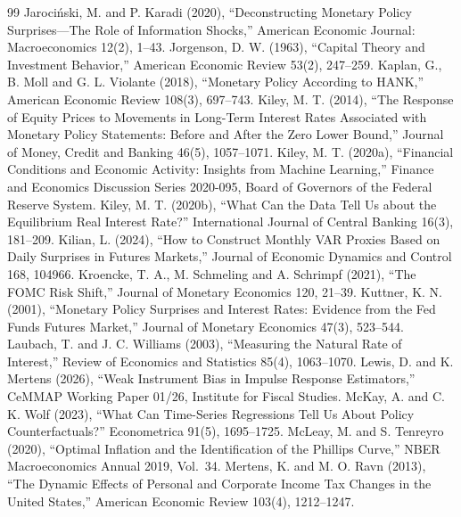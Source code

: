 \documentclass[11pt]{article}
\begin{document}
\begin{thebibliography}{99}
 Jaroci\'nski, M. and P. Karadi (2020), ``Deconstructing Monetary Policy Surprises---The Role of Information Shocks,'' American Economic Journal: Macroeconomics 12(2), 1--43.
 Jorgenson, D. W. (1963), ``Capital Theory and Investment Behavior,'' American Economic Review 53(2), 247--259.
 Kaplan, G., B. Moll and G. L. Violante (2018), ``Monetary Policy According to HANK,'' American Economic Review 108(3), 697--743.
 Kiley, M. T. (2014), ``The Response of Equity Prices to Movements in Long-Term Interest Rates Associated with Monetary Policy Statements: Before and After the Zero Lower Bound,'' Journal of Money, Credit and Banking 46(5), 1057--1071.
 Kiley, M. T. (2020a), ``Financial Conditions and Economic Activity: Insights from Machine Learning,'' Finance and Economics Discussion Series 2020-095, Board of Governors of the Federal Reserve System.
 Kiley, M. T. (2020b), ``What Can the Data Tell Us about the Equilibrium Real Interest Rate?'' International Journal of Central Banking 16(3), 181--209.
 Kilian, L. (2024), ``How to Construct Monthly VAR Proxies Based on Daily Surprises in Futures Markets,'' Journal of Economic Dynamics and Control 168, 104966.
 Kroencke, T. A., M. Schmeling and A. Schrimpf (2021), ``The FOMC Risk Shift,'' Journal of Monetary Economics 120, 21--39.
 Kuttner, K. N. (2001), ``Monetary Policy Surprises and Interest Rates: Evidence from the Fed Funds Futures Market,'' Journal of Monetary Economics 47(3), 523--544.
 Laubach, T. and J. C. Williams (2003), ``Measuring the Natural Rate of Interest,'' Review of Economics and Statistics 85(4), 1063--1070.
 Lewis, D. and K. Mertens (2026), ``Weak Instrument Bias in Impulse Response Estimators,'' CeMMAP Working Paper 01/26, Institute for Fiscal Studies.
 McKay, A. and C. K. Wolf (2023), ``What Can Time-Series Regressions Tell Us About Policy Counterfactuals?'' Econometrica 91(5), 1695--1725.
 McLeay, M. and S. Tenreyro (2020), ``Optimal Inflation and the Identification of the Phillips Curve,'' NBER Macroeconomics Annual 2019, Vol.\ 34.
 Mertens, K. and M. O. Ravn (2013), ``The Dynamic Effects of Personal and Corporate Income Tax Changes in the United States,'' American Economic Review 103(4), 1212--1247.

\end{thebibliography}
\end{document}
